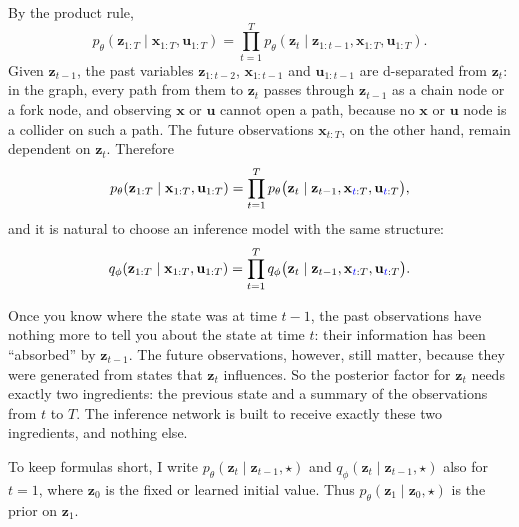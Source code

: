 By the product rule,
\[
    p_{\theta}(\mathbf{z}_{1:T} \mid \mathbf{x}_{1:T}, \mathbf{u}_{1:T})
    = \prod_{t=1}^T p_{\theta}(\mathbf{z}_t \mid \mathbf{z}_{1:t-1},
    \mathbf{x}_{1:T}, \mathbf{u}_{1:T}).
\]
Given $\mathbf{z}_{t-1}$, the past variables $\mathbf{z}_{1:t-2}$,
$\mathbf{x}_{1:t-1}$ and $\mathbf{u}_{1:t-1}$ are d-separated from
$\mathbf{z}_{t}$: in the graph, every path from them to $\mathbf{z}_t$
passes through $\mathbf{z}_{t-1}$ as a chain node or a fork node, and
observing $\mathbf{x}$ or $\mathbf{u}$ cannot open a path, because no
$\mathbf{x}$ or $\mathbf{u}$ node is a collider on such a path. The
future observations $\mathbf{x}_{t:T}$, on the other hand, remain
dependent on $\mathbf{z}_t$. Therefore
\begin{equation*}
    p_{\theta}(\mathbf{z}_{1:T} \mid \mathbf{x}_{1:T}, \mathbf{u}_{1:T})
    = \prod_{t=1}^T p_{\theta}\big(\mathbf{z}_t \mid
    \mathbf{z}_{t-1}, \mathbf{x}_{\textcolor{blue}{t}:T},
    \mathbf{u}_{\textcolor{blue}{t}:T}\big),
\end{equation*}
and it is natural to choose an inference model with the same structure:
\begin{equation}
    q_{\phi}(\mathbf{z}_{1:T} \mid \mathbf{x}_{1:T}, \mathbf{u}_{1:T}) =
    \prod_{t=1}^T q_{\phi}\big(\mathbf{z}_t \mid \mathbf{z}_{t-1},
    \mathbf{x}_{\textcolor{blue}{t}:T},
    \mathbf{u}_{\textcolor{blue}{t}:T}\big).
    \label{q_phi}
\end{equation}

\begin{inwords}
Once you know where the state was at time $t-1$, the past observations
have nothing more to tell you about the state at time $t$: their
information has been \enquote{absorbed} by $\mathbf{z}_{t-1}$. The
future observations, however, still matter, because they were generated
from states that $\mathbf{z}_t$ influences. So the posterior factor for
$\mathbf{z}_t$ needs exactly two ingredients: the previous state and a
summary of the observations from $t$ to $T$. The inference network is
built to receive exactly these two ingredients, and nothing else.
\end{inwords}

\begin{story}[{Notation for $t=1$}]
To keep formulas short, I write $p_{\theta}(\mathbf{z}_{t} \mid
\mathbf{z}_{t-1}, \star)$ and $q_{\phi}(\mathbf{z}_{t} \mid
\mathbf{z}_{t-1}, \star)$ also for $t = 1$, where $\mathbf{z}_0$ is the
fixed or learned initial value. Thus $p_{\theta}(\mathbf{z}_{1} \mid
\mathbf{z}_{0}, \star)$ is the prior on $\mathbf{z}_{1}$.
\end{story}

